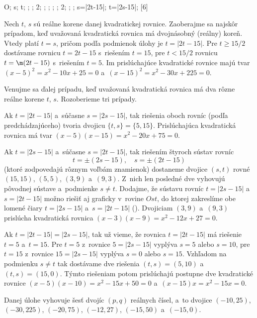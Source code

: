 ﻿{%
\fontplace
\rtpoint O; \tpoint s; \rpoint t;
; ; \tpoint{}2;
; ;
; ; \rpoint{}2;
; ;
\lBpoint s=|2t-15|; \lpoint t=|2s-15|;
[6] \hfil\Obr

Nech $t$, $s$ sú reálne korene danej kvadratickej rovnice.
Zaoberajme sa najskôr prípadom, keď uvažovaná kvadratická rovnica má
dvojnásobný (reálny) koreň. Vtedy platí $t=s$, pričom podľa
podmienok úlohy je $t=|2t-15|$. Pre $t\ge15/2$ dostávame rovnicu
$t=2t-15$ s~riešením $t=15$, pre $t<15/2$ rovnicu $t=\m(2t-15)$ 
s~riešením $t=5$. Im prislúchajúce kvadratické rovnice majú tvar
$(x-5)^2=x^2-10x+25=0$ a~$(x-15)^2=x^2-30x+225=0$.

Venujme sa ďalej prípadu, keď uvažovaná kvadratická rovnica má dva
rôzne reálne korene $t$, $s$. Rozoberieme tri prípady.

\smallskip
Ak $t=|2t-15|$ a~súčasne $s=|2s-15|$, tak riešenia oboch
rovníc (podľa predchádzajúceho) tvoria dvojicu $\{t,s\}=\{5,15\}$. Prislúchajúca
kvadratická rovnica má tvar $(x-5)(x-15)=x^2-20x+75=0$.

\smallskip
Ak $t=|2s-15|$ a~súčasne $s=|2t-15|$, tak riešením
štyroch sústav rovníc
$$
t=\pm(2s-15),\quad s=\pm(2t-15)
$$
(ktoré zodpovedajú rôznym voľbám znamienok) dostaneme dvojice $(s,t)$
rovné $(15,15)$, $(5,5)$, $(3,9)$ a~$(9,3)$. Z~nich len
posledné dve vyhovujú pôvodnej sústave a~podmienke $s\ne t$.
Dodajme, že sústavu rovníc $t=|2s-15|$ a~$s=|2t-15|$ možno
riešiť aj graficky v~rovine $Ost$, do ktorej zakreslíme obe lomené
čiary $t=|2s-15|$ a~$s=|2t-15|$ (\obr).
Dvojiciam $(3,9)$ a~$(9,3)$ prislúcha kvadratická rovnica
$(x-3)(x-9)=x^2-12x+27=0$.
\inspicture{}

\smallskip
Ak $t=|2t-15|=|2s-15|$, tak už vieme, že rovnica
$t=|2t-15|$ má riešenie $t=5$ a~$t=15$. Pre $t=5$ z~rovnice
$5=|2s-15|$ vyplýva $s=5$ alebo $s=10$, pre $t=15$ z~rovnice
$15=|2s-15|$ vyplýva $s=0$ alebo $s=15$. Vzhľadom na podmienku $s\ne
t$ tak dostávame dve riešenia $(t,s)=(5,10)$
a~$(t,s)=(15,0)$. Týmto riešeniam potom prislúchajú postupne dve
kvadratické rovnice $(x-5)(x-10)=x^2-15x+50=0$ 
a~$(x-15)x=x^2-15x=0$.

\zaver
Danej úlohe vyhovuje šesť dvojíc $(p,q)$ reálnych
čísel, a~to dvojice $(-10,25)$, $(-30,225)$, $(-20,75)$,
$(-12,27)$, $(-15,50)$ a~$(-15,0)$.}

